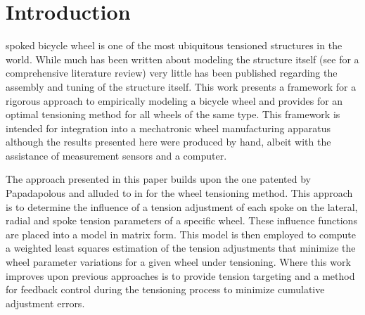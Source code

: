 \documentclass[journal]{IEEEtran}
\begin{document}
\section{Introduction}
 spoked bicycle wheel is one of the most ubiquitous tensioned structures in the world. While much has been written about modeling the structure itself (see \cite{FordThesis} for a comprehensive literature review) very little has been published regarding the assembly and tuning of the structure itself.  This work presents a framework for a rigorous approach to empirically modeling a bicycle wheel and provides for an optimal tensioning method for all wheels of the same type.  This framework is intended for integration into a mechatronic wheel manufacturing apparatus although the results presented here were produced by hand, albeit with the assistance of measurement sensors and a computer. 

The approach presented in this paper builds upon the one patented by Papadapolous \cite{Papadapoulos} and alluded to in \cite{HollandMech} for the wheel tensioning method. This approach is to determine the influence of a tension adjustment of each spoke on the lateral, radial and spoke tension parameters of a specific wheel.  These influence functions are placed into a model in matrix form.  This model is then employed to compute a weighted least squares estimation of the tension adjustments that minimize the wheel parameter variations for a given wheel under tensioning.  Where this work improves upon previous approaches is to provide tension targeting and a method for feedback control during the tensioning process to minimize cumulative adjustment errors. 
\end{document}
